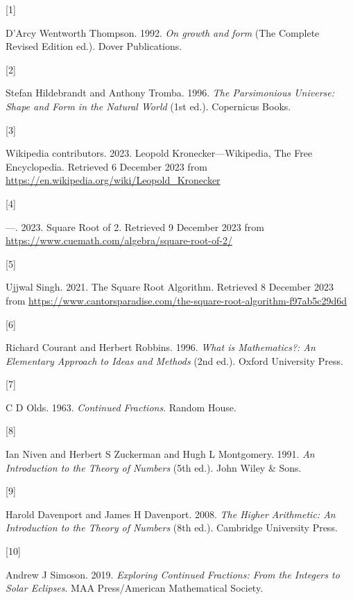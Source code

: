 \documentclass[
  a4paper,
]{article}
\newlength{\cslhangindent}
\newlength{\csllabelwidth}
\newenvironment{CSLReferences}[2] %
 {\begin{list}{}{%
  \setlength{\itemindent}{0pt}
  \setlength{\leftmargin}{0pt}
  \setlength{\parsep}{0pt}
  \ifodd #1
   \setlength{\leftmargin}{\cslhangindent}
   \setlength{\itemindent}{-1\cslhangindent}
  \fi
  \setlength{\itemsep}{#2\baselineskip}}}
 {\end{list}}
\newcommand{\CSLLeftMargin}[1]{\parbox[t]{\csllabelwidth}{\strut#1\strut}}
\newcommand{\CSLRightInline}[1]{\parbox[t]{\linewidth - \csllabelwidth}{\strut#1\strut}}
\begin{document}
\label{refs}
\begin{CSLReferences}{0}{0}
\CSLLeftMargin{{[}1{]} }%
\CSLRightInline{D'Arcy Wentworth Thompson. 1992. \emph{On growth and
form} (The Complete Revised Edition ed.). Dover Publications.}

\CSLLeftMargin{{[}2{]} }%
\CSLRightInline{Stefan Hildebrandt and Anthony Tromba. 1996. \emph{{The
Parsimonious Universe: Shape and Form in the Natural World}} (1st ed.).
Copernicus Books.}

\CSLLeftMargin{{[}3{]} }%
\CSLRightInline{Wikipedia contributors. 2023. {Leopold
Kronecker---Wikipedia, The Free Encyclopedia}. Retrieved 6 December 2023
from \url{https://en.wikipedia.org/wiki/Leopold_Kronecker}}

\CSLLeftMargin{{[}4{]} }%
\CSLRightInline{---. 2023. {Square Root of 2}. Retrieved 9 December 2023
from \url{https://www.cuemath.com/algebra/square-root-of-2/}}

\CSLLeftMargin{{[}5{]} }%
\CSLRightInline{Ujjwal Singh. 2021. {The Square Root Algorithm}.
Retrieved 8 December 2023 from
\url{https://www.cantorsparadise.com/the-square-root-algorithm-f97ab5c29d6d}}

\CSLLeftMargin{{[}6{]} }%
\CSLRightInline{Richard Courant and Herbert Robbins. 1996. \emph{{What
is Mathematics?}: {An Elementary Approach to Ideas and Methods}} (2nd
ed.). Oxford University Press.}

\CSLLeftMargin{{[}7{]} }%
\CSLRightInline{C D Olds. 1963. \emph{{Continued Fractions}}. Random
House.}

\CSLLeftMargin{{[}8{]} }%
\CSLRightInline{Ian Niven and Herbert S Zuckerman and Hugh L Montgomery.
1991. \emph{{An Introduction to the Theory of Numbers}} (5th ed.). John
Wiley \& Sons.}

\CSLLeftMargin{{[}9{]} }%
\CSLRightInline{Harold Davenport and James H Davenport. 2008. \emph{{The
Higher Arithmetic}: {An Introduction to the Theory of Numbers}} (8th
ed.). Cambridge University Press.}

\CSLLeftMargin{{[}10{]} }%
\CSLRightInline{Andrew J Simoson. 2019. \emph{{Exploring Continued
Fractions}: {From the Integers to Solar Eclipses}}. MAA Press/American
Mathematical Society.}


\end{CSLReferences}
\end{document}
